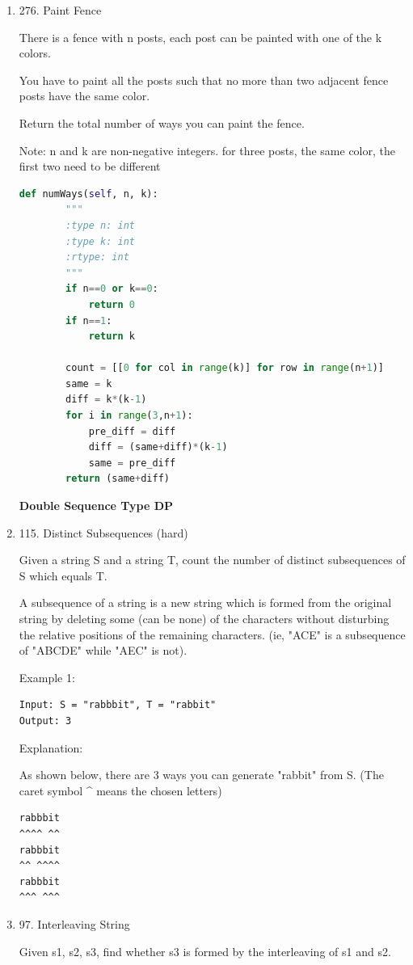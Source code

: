 \documentclass[../main.tex]{subfiles}
\begin{document}
\begin{enumerate}
\item 276. Paint Fence

There is a fence with n posts, each post can be painted with one of the k colors.

You have to paint all the posts such that no more than two adjacent fence posts have the same color.

Return the total number of ways you can paint the fence.

Note:
 n and k are non-negative integers.
for three posts, the same color, the first two need to be different
\begin{lstlisting}[language = Python]
def numWays(self, n, k):
        """
        :type n: int
        :type k: int
        :rtype: int
        """
        if n==0 or k==0:
            return 0
        if n==1:
            return k
        
        count = [[0 for col in range(k)] for row in range(n+1)]
        same = k
        diff = k*(k-1)
        for i in range(3,n+1):
            pre_diff = diff
            diff = (same+diff)*(k-1)
            same = pre_diff
        return (same+diff)
\end{lstlisting}

\textbf{Double Sequence Type DP}

\item 115. Distinct Subsequences (hard)

Given a string S and a string T, count the number of distinct subsequences of S which equals T.

A subsequence of a string is a new string which is formed from the original string by deleting some (can be none) of the characters without disturbing the relative positions of the remaining characters. (ie, "ACE" is a subsequence of "ABCDE" while "AEC" is not).

Example 1:
\begin{lstlisting}
Input: S = "rabbbit", T = "rabbit"
Output: 3
\end{lstlisting}
Explanation:

As shown below, there are 3 ways you can generate "rabbit" from S.
(The caret symbol \string^ means the chosen letters)

\begin{lstlisting}
rabbbit
^^^^ ^^
rabbbit
^^ ^^^^
rabbbit
^^^ ^^^
\end{lstlisting}

\item 97. Interleaving String

Given s1, s2, s3, find whether s3 is formed by the interleaving of s1 and s2.


\end{enumerate}
\end{document}
